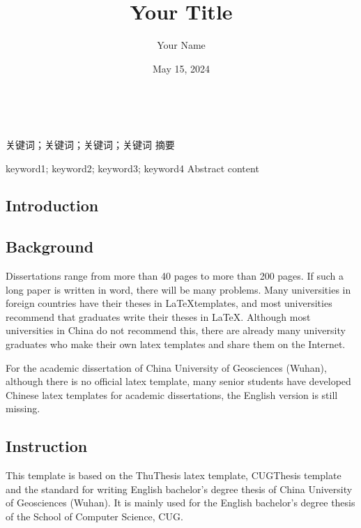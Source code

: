 \documentclass[twoside]{CUGCSthesis_EN}
\title{Your Title} %
\author{Your Name} %
\date{May 15, 2024} %
\begin{document}
	\maketitle
	\makestatement\

	\begin{cnabstract}{关键词；关键词；关键词；关键词}
 	\pagestyle{plain}
		摘要
	\end{cnabstract}
	
	\begin{enabstract}{keyword1; keyword2; keyword3; keyword4}
		Abstract content
	\end{enabstract}
	
	\makeToc
	
	
	\begin{spacing}{2}
		\section{Introduction}
	\end{spacing}

	\subsection{Background}
	Dissertations range from more than 40 pages to more than 200 pages. If such a long paper is written in word, there will be many problems.
	Many universities in foreign countries have their theses in \LaTeX templates, and most universities recommend that graduates write their theses in \LaTeX.
	Although most universities in China do not recommend this, there are already many university graduates who make their own latex templates and 
	share them on the Internet.

	For the academic dissertation of China University of Geosciences (Wuhan), although there is no official latex template, many senior students 
	have developed Chinese latex templates for academic dissertations, the English version is still missing.

	\subsection{Instruction}
	This template is based on the ThuThesis latex template, CUGThesis template and the standard for writing English bachelor's degree thesis of China 
	University of Geosciences (Wuhan). It is mainly used for the English bachelor's degree thesis of the School of Computer Science, CUG.
\end{document}
